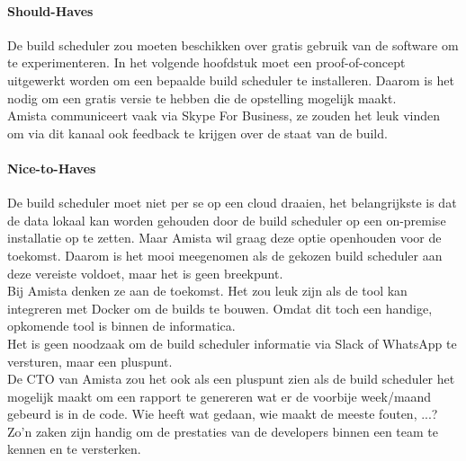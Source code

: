             \paragraph{Should-Haves}
            De build scheduler zou moeten beschikken over gratis gebruik van de software om te experimenteren. In het volgende hoofdstuk moet een proof-of-concept uitgewerkt worden om een bepaalde build scheduler te installeren. Daarom is het nodig om een gratis versie te hebben die de opstelling mogelijk maakt.\\
            Amista communiceert vaak via Skype For Business, ze zouden het leuk vinden om via dit kanaal ook feedback te krijgen over de staat van de build.
            
            
            \paragraph{Nice-to-Haves}
            De build scheduler moet niet per se op een cloud draaien, het belangrijkste is dat de data lokaal kan worden gehouden door de build scheduler op een on-premise installatie op te zetten. Maar Amista wil graag deze optie openhouden voor de toekomst. Daarom is het mooi meegenomen als de gekozen build scheduler aan deze vereiste voldoet, maar het is geen breekpunt.\\
            Bij Amista denken ze aan de toekomst. Het zou leuk zijn als de tool kan integreren met Docker om de builds te bouwen. Omdat dit toch een handige, opkomende tool is binnen de informatica.\\
            Het is geen noodzaak om de build scheduler informatie via Slack of WhatsApp te versturen, maar een pluspunt.\\
            De CTO van Amista zou het ook als een pluspunt zien als de build scheduler het mogelijk maakt om een rapport te genereren wat er de voorbije week/maand gebeurd is in de code. Wie heeft wat gedaan, wie maakt de meeste fouten, ...? Zo'n zaken zijn handig om de prestaties van de developers binnen een team te kennen en te versterken.

